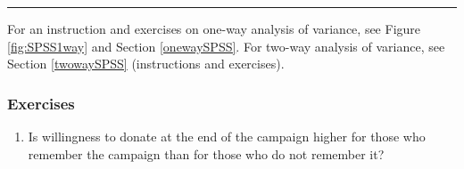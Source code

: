 \documentclass[a4paper]{book}
\providecommand{\tightlist}{%
  \setlength{\itemsep}{0pt}\setlength{\parskip}{0pt}}
\theoremstyle{definition}
\theoremstyle{definition}
\theoremstyle{definition}
\theoremstyle{remark}
\begin{document}
\begin{center}\rule{0.5\linewidth}{\linethickness}\end{center}

For an instruction and exercises on one-way analysis of variance, see
Figure \ref{fig:SPSS1way} and Section \ref{onewaySPSS}. For two-way
analysis of variance, see Section \ref{twowaySPSS} (instructions and
exercises).

\subsubsection*{Exercises}\label{exercises-13}

\begin{enumerate}
\def\labelenumi{\arabic{enumi}.}
\tightlist
\item
  Is willingness to donate at the end of the campaign higher for those
  who remember the campaign than for those who do not remember it?
\end{enumerate}
\end{document}
